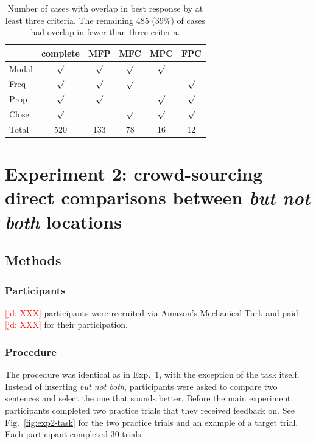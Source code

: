 \documentclass[11pt,letterpaper]{article}
\newcommand{\jd}[1]{\textcolor{Red}{[jd: #1]}}
\newcommand{\figref}[1]{Fig.~\ref{#1}}
\begin{document}
\begin{table}
\centering
\caption{Number of cases with overlap in best response by at least three criteria. The remaining 485 (39\%) of cases had overlap in fewer than three criteria.}
\begin{tabular}{l c c c c c}
\toprule
 & complete & MFP & MFC & MPC & FPC \\
\midrule
	Modal & $\surd$ & $\surd$ & $\surd$ & $\surd$ &  \\
	Freq &  $\surd$ & $\surd$ &  $\surd$ &  & $\surd$ \\	
	Prop & $\surd$ & $\surd$ & & $\surd$ & $\surd$ \\	
	Close & $\surd$ & & $\surd$ & $\surd$ & $\surd$ \\	
\midrule
Total & 520 & 133 & 78 & 16 & 12	\\
\bottomrule	
\end{tabular}
\end{table}

\section{Experiment 2: crowd-sourcing direct comparisons between \emph{but not both} locations}


\subsection{Methods}

\subsubsection{Participants}

\jd{XXX} participants were recruited via Amazon's Mechanical Turk and paid \jd{XXX} for their participation.


\subsubsection{Procedure}

The procedure was identical as in Exp.~1, with the exception of the task itself. Instead of inserting \emph{but not both}, participants were asked to compare two sentences and select the one that sounds better. Before the main experiment, participants completed two practice trials that they received feedback on. See \figref{fig:exp2-task} for the two practice trials and an example of a target trial. Each participant completed 30 trials.
\end{document}
